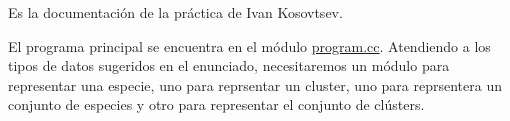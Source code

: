 Es la documentación de la práctica de Ivan Kosovtsev.

El programa principal se encuentra en el módulo \mbox{\hyperlink{program_8cc}{program.\+cc}}. Atendiendo a los tipos de datos sugeridos en el enunciado, necesitaremos un módulo para representar una especie, uno para reprsentar un cluster, uno para reprsentera un conjunto de especies y otro para representar el conjunto de clústers. 